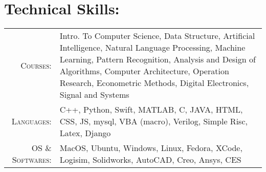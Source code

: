 \documentclass[a4paper,10pt]{article}
\begin{document}
\section{Technical Skills:}
\begin{tabular}{r|p{15cm}}
 \textsc{Courses:}&Intro. To Computer Science, Data Structure, Artificial Intelligence, Natural Language Processing, Machine Learning, Pattern Recognition, Analysis and Design of Algorithms, Computer Architecture, Operation Research, Econometric Methods, Digital Electronics, Signal and Systems\\
\textsc{Languages:}&C++, Python, Swift, MATLAB, C, JAVA, HTML, CSS, JS, mysql, VBA (macro), Verilog, Simple Risc, Latex, Django\\
\textsc{OS \& Softwares:}&MacOS, Ubuntu, Windows, Linux, Fedora, XCode, Logisim, Solidworks, AutoCAD, Creo, Ansys, CES\\
\end{tabular}


\end{document}
